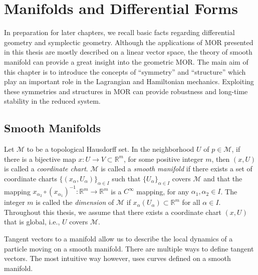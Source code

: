 \chapter{Manifolds and Differential Forms} \label{chapter:2}

In preparation for later chapters, we recall basic facts regarding differential geometry and symplectic geometry. Although the applications of MOR presented in this thesis are mostly described on a linear vector space, the theory of smooth manifold can provide a great insight into the geometric MOR. The main aim of this chapter is to introduce the concepts of ``symmetry'' and ``structure'' which play an important role in the Lagrangian and Hamiltonian mechanics. Exploiting these symmetries and structures in MOR can provide robustness and long-time stability in the reduced system.

\section{Smooth Manifolds} \label{section:2.1}
Let $\mathcal M$ to be a topological Hausdorff \cite{friedman1970foundations} set. In the neighborhood $U$ of $p\in \mathcal M$, if there is a bijective map $x:U\to V\subset \mathbb R^{m}$, for some positive integer $m$, then $(x,U)$ is called a \emph{coordinate chart}. $\mathcal M$ is called a \emph{smooth manifold} if there exists a set of coordinate charts $\{(x_{\alpha},U_{\alpha})\}_{\alpha\in I}$ such that $\{U_{\alpha}\}_{\alpha\in I}$ covers $\mathcal M$ and that the mapping $x_{\alpha_2}\circ (x_{\alpha_1})^{-1}:\mathbb R^{m} \to \mathbb R^{m}$ is a $C^{\infty}$ mapping, for any $\alpha_1,\alpha_2\in I$. The integer $m$ is called the \emph{dimension} of $\mathcal M$ if $x_{\alpha}(U_{\alpha}) \subset \mathbb R^{m}$ for all $\alpha \in I$. Throughout this thesis, we assume that there exists a coordinate chart $(x,U)$ that is global, i.e., $U$ covers $\mathcal M$.

Tangent vectors to a manifold allow us to describe the local dynamics of a particle moving on a smooth manifold. There are multiple ways to define tangent vectors. The most intuitive way however, uses curves defined on a smooth manifold.

